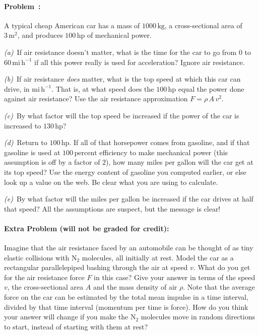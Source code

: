 \documentclass[12pt]{article}
\newcommand{\kg}{\mathrm{kg}}
\newcommand{\m}{\mathrm{m}}
\newcommand{\hp}{\mathrm{hp}}
\newcommand{\percent}{\mathrm{percent}}
\newcommand{\mph}{\mathrm{mi}\,\mathrm{h}^{-1}}
\newcounter{problem}
\begin{document}
\paragraph{Problem~\theproblem:}%
A typical cheap American car has a mass of $1000\,\kg$, a
cross-sectional area of $3\,\m^2$, and produces $100\,\hp$ of
mechanical power.

\textsl{(a)}~If air resistance doesn't matter, what is the time for
the car to go from 0 to $60\,\mph$ if all this power really is used
for acceleration?  Ignore air resistance.

\textsl{(b)}~If air resistance \emph{does} matter, what is the top
speed at which this car can drive, in $\mph$.  That is, at what speed
does the $100\,\hp$ equal the power done against air resistance?  Use
the air resistance approximation $F=\rho\,A\,v^2$.

\textsl{(c)}~By what factor will the top speed be increased if the
power of the car is increased to $130\,\hp$?

\textsl{(d)}~Return to $100\,\hp$.  If all of that horsepower comes
from gasoline, and if that gasoline is used at $100\,\percent$
efficiency to make mechanical power (this assumption is off by a
factor of $2$), how many miles per gallon will the car get at its top
speed?  Use the energy content of gasoline you computed earlier, or
else look up a value on the web.  Be clear what you are using to
calculate.

\textsl{(e)}~By what factor will the miles per gallon be increased if
the car drives at half that speed?  All the assumptions are suspect,
but the message is clear!

\paragraph{Extra Problem (will not be graded for credit):}
Imagine that the air resistance faced by an automobile can be thought
of as tiny elastic collisions with $\mathrm{N}_2$ molecules, all
initially at rest.  Model the car as a rectangular parallelepiped
bashing through the air at speed $v$.  What do you get for the air
resistance force $F$ in this case?  Give your answer in terms of the
speed $v$, the cross-sectional area $A$ and the mass density of air
$\rho$.  Note that the average force on the car can be estimated by
the total mean impulse in a time interval, divided by that time
interval (momentum per time is force).  How do you think your answer
will change if you make the $\mathrm{N}_2$ molecules move in random
directions to start, instead of starting with them at rest?
\end{document}
